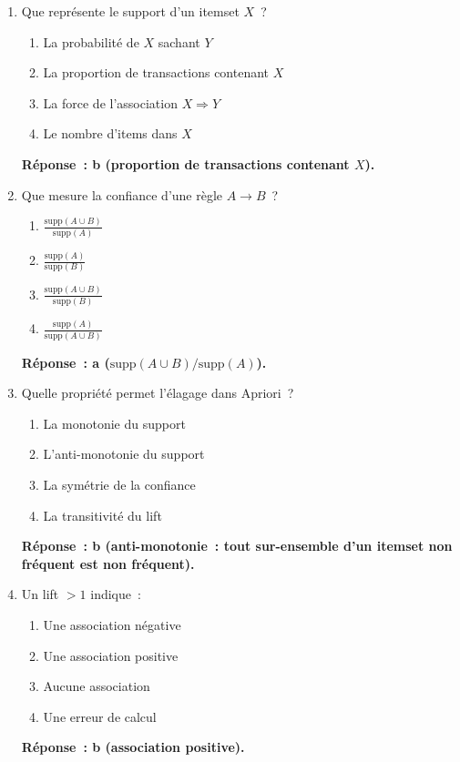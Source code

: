 \documentclass[a4paper,11pt]{article}
\theoremstyle{definition}
\theoremstyle{remark}
\begin{document}

\begin{enumerate}

  \item Que repr\'esente le support d'un itemset $X$~?
    \begin{enumerate}
      \item La probabilit\'e de $X$ sachant $Y$
      \item La proportion de transactions contenant $X$
      \item La force de l'association $X \Rightarrow Y$
      \item Le nombre d'items dans $X$
    \end{enumerate}
    \textbf{R\'eponse~: b (proportion de transactions contenant $X$).}

  \item Que mesure la confiance d'une r\`egle $A \rightarrow B$~?
    \begin{enumerate}
      \item $\displaystyle \frac{\text{supp}(A \cup B)}{\text{supp}(A)}$
      \item $\displaystyle \frac{\text{supp}(A)}{\text{supp}(B)}$
      \item $\displaystyle \frac{\text{supp}(A \cup B)}{\text{supp}(B)}$
      \item $\displaystyle \frac{\text{supp}(A)}{\text{supp}(A \cup B)}$
    \end{enumerate}
    \textbf{R\'eponse~: a ($\text{supp}(A \cup B) / \text{supp}(A)$).}

  \item Quelle propri\'et\'e permet l'\'elagage dans Apriori~?
    \begin{enumerate}
      \item La monotonie du support
      \item L'anti-monotonie du support
      \item La sym\'etrie de la confiance
      \item La transitivit\'e du lift
    \end{enumerate}
    \textbf{R\'eponse~: b (anti-monotonie~: tout sur-ensemble d'un
    itemset non fr\'equent est non fr\'equent).}

  \item Un lift $> 1$ indique~:
    \begin{enumerate}
      \item Une association n\'egative
      \item Une association positive
      \item Aucune association
      \item Une erreur de calcul
    \end{enumerate}
    \textbf{R\'eponse~: b (association positive).}


\end{enumerate}
\end{document}
